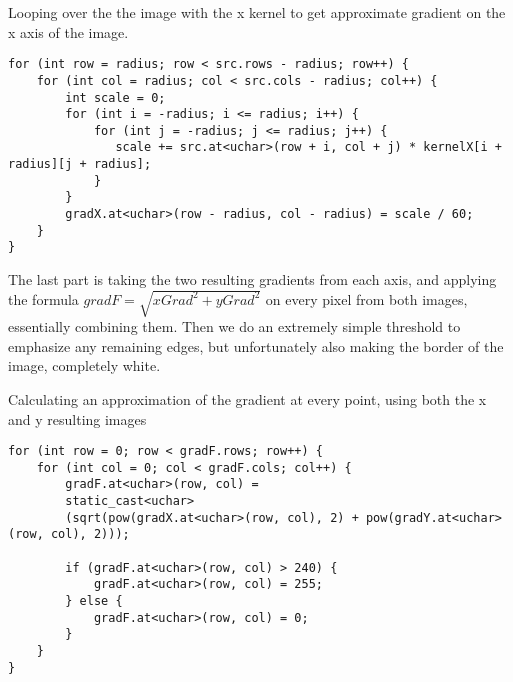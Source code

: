 \begin{listing}[H]
	\caption{Looping over the the image with the x kernel to get approximate gradient on the x axis of the image.}
	\label{listing:xLoop}
	\begin{verbatim}
for (int row = radius; row < src.rows - radius; row++) {
	for (int col = radius; col < src.cols - radius; col++) {
		int scale = 0;
		for (int i = -radius; i <= radius; i++) {
			for (int j = -radius; j <= radius; j++) {
			   scale += src.at<uchar>(row + i, col + j) * kernelX[i + radius][j + radius];
			}
		}
		gradX.at<uchar>(row - radius, col - radius) = scale / 60;
	}
}
	\end{verbatim}
\end{listing}

The last part is taking the two resulting gradients from each axis, and applying the formula $gradF = \sqrt{xGrad^2+yGrad^2}$ on every pixel from both images, essentially combining them. Then we do an extremely simple threshold to emphasize any remaining edges, but unfortunately also making the border of the image, completely white.

\begin{listing}[H]
	\caption{Calculating an approximation of the gradient at every point, using both the x and y resulting images}
	\label{listing:finalGradient}
	\begin{verbatim}
for (int row = 0; row < gradF.rows; row++) {
	for (int col = 0; col < gradF.cols; col++) {
		gradF.at<uchar>(row, col) = 
		static_cast<uchar>
		(sqrt(pow(gradX.at<uchar>(row, col), 2) + pow(gradY.at<uchar>(row, col), 2)));
		
		if (gradF.at<uchar>(row, col) > 240) {
			gradF.at<uchar>(row, col) = 255;
		} else {
			gradF.at<uchar>(row, col) = 0;
		}
	}
}
	\end{verbatim}
\end{listing}
